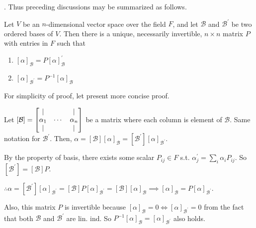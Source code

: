\documentclass[8pt]{beamer}
\newcommand{\mc}[1]{\mathcal{#1}}
\begin{document}
\begin{frame}{.}
    Thus preceding discussions may be summarized as follows.

    \begin{theorem} \label{th:4}
        Let $V$ be an $n$-dimensional vector space over the field $F$, and let $\mc{B}$ and $\mc{B}^\prime$ be two ordered bases of $V$. Then there is a unique, necessarily invertible, $n \times n$ matrix $P$ with entries in $F$ such that
        \begin{enumerate}
            \item $[\alpha]_{\mc{B}} = P [\alpha]_{\mc{B}}^\prime$
            \item $[\alpha]_{\mc{B}^\prime} = P^{-1} [\alpha]_{\mc{B}}$
        \end{enumerate}
    \end{theorem}

    For simplicity of proof, let present more concise proof.




    Let $[\mc{B}] =  \left[\begin{matrix} | & \empty & | \\ \alpha_1 & \cdots & \alpha_n \\ | & \empty & | \end{matrix}\right]$ be a matrix where each column is element of $\mc{B}$. 
    Same notation for $\mc{B}^\prime$.
    Then, $\alpha = [\mc{B}] [\alpha]_{\mc{B}} = [\mc{B}^\prime] [\alpha]_{\mc{B}^\prime}$.

    By the property of basis, there exists some scalar $P_{ij} \in F$ s.t. $\alpha^\prime_j = \sum_i \alpha_i P_{ij}$. So $[\mc{B}^\prime] = [\mc{B}] P$.

    $\therefore \alpha = [\mc{B}^\prime] [\alpha]_{\mc{B}^\prime} = [\mc{B}] P [\alpha]_{\mc{B}^\prime} = [\mc{B}] [\alpha]_{\mc{B}} \implies [\alpha]_\mc{B} = P [\alpha]_{\mc{B}^\prime}$.

    Also, this matrix $P$ is invertible because $[\alpha]_{\mc{B}} = 0 \iff [\alpha]_{\mc{B}^\prime} = 0$ from the fact that both $\mc{B}$ and $\mc{B}^\prime$ are lin. ind. So $P^{-1} [\alpha]_{\mc{B}} = [\alpha]_{\mc{B}^\prime}$ also holds.


\end{frame}
\end{document}
